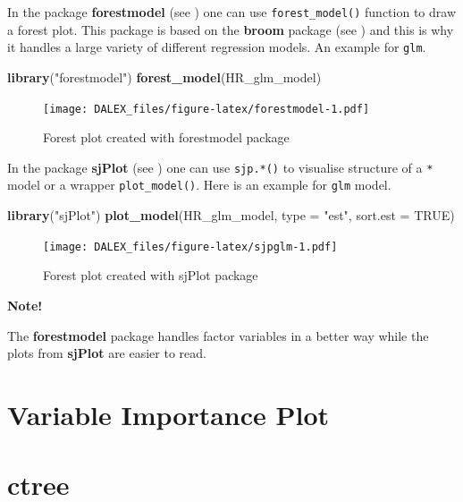 \documentclass[]{book}
\newenvironment{Shaded}{\begin{snugshade}}{\end{snugshade}}
\newcommand{\KeywordTok}[1]{\textcolor[rgb]{0.13,0.29,0.53}{\textbf{#1}}}
\newcommand{\DataTypeTok}[1]{\textcolor[rgb]{0.13,0.29,0.53}{#1}}
\newcommand{\StringTok}[1]{\textcolor[rgb]{0.31,0.60,0.02}{#1}}
\newcommand{\OtherTok}[1]{\textcolor[rgb]{0.56,0.35,0.01}{#1}}
\newcommand{\NormalTok}[1]{#1}
\theoremstyle{definition}
\theoremstyle{definition}
\theoremstyle{definition}
\theoremstyle{remark}
\begin{document}
In the package \textbf{forestmodel} (see \citep{forestmodel}) one can
use \texttt{forest\_model()} function to draw a forest plot. This
package is based on the \textbf{broom} package (see \citep{broom}) and
this is why it handles a large variety of different regression models.
An example for \texttt{glm}.

\begin{Shaded}
\begin{Highlighting}[]
\KeywordTok{library}\NormalTok{(}\StringTok{"forestmodel"}\NormalTok{)}
\KeywordTok{forest_model}\NormalTok{(HR_glm_model)}
\end{Highlighting}
\end{Shaded}

\begin{figure}
\centering
\texttt{[image: DALEX\_files/figure-latex/forestmodel-1.pdf]}
\caption{\label{fig:forestmodel}Forest plot created with forestmodel
package}
\end{figure}

In the package \textbf{sjPlot} (see \citep{sjPlot}) one can use
\texttt{sjp.*()} to visualise structure of a \texttt{*} model or a
wrapper \texttt{plot\_model()}. Here is an example for \texttt{glm}
model.

\begin{Shaded}
\begin{Highlighting}[]
\KeywordTok{library}\NormalTok{(}\StringTok{"sjPlot"}\NormalTok{)}
\KeywordTok{plot_model}\NormalTok{(HR_glm_model, }\DataTypeTok{type =} \StringTok{"est"}\NormalTok{, }\DataTypeTok{sort.est =} \OtherTok{TRUE}\NormalTok{)}
\end{Highlighting}
\end{Shaded}

\begin{figure}
\centering
\texttt{[image: DALEX\_files/figure-latex/sjpglm-1.pdf]}
\caption{\label{fig:sjpglm}Forest plot created with sjPlot package}
\end{figure}

\textbf{Note!}

The \textbf{forestmodel} package handles factor variables in a better
way while the plots from \textbf{sjPlot} are easier to read.

\section{Variable Importance Plot}\label{variable-importance-plot}

\section{ctree}\label{ctree}
\end{document}
